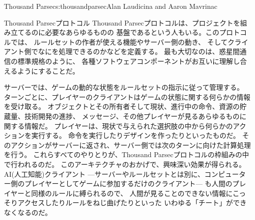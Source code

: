 \begin{aosachapter}{Thousand Parsec}{s:thousandparsec}{Alan Laudicina and Aaron Mavrinac}
\begin{aosasect1}{Thousand Parsecプロトコル}
Thousand Parsecプロトコルは、プロジェクトを組み立てるのに必要なあらゆるものの
基盤であるという人もいる。このプロトコルでは、
ルールセットの作者が使える機能やサーバー側の動き、
そしてクライアント側でなにを処理できるのかなどを定義する。
最も大切なのは、惑星間通信の標準規格のように、
各種ソフトウェアコンポーネントがお互いに理解し合えるようにすることだ。

サーバーでは、ゲームの動的な状態をルールセットの指示に従って管理する。
ターンごとに、プレイヤーのクライアントはゲームの状態に関する何らかの情報を受け取る。
オブジェクトとその所有者そして現状、進行中の命令、資源の貯蔵量、技術開発の進捗、
メッセージ、その他プレイヤーが見るあらゆるものに関する情報だ。
プレイヤーは、現状で与えられた選択肢の中から何らかのアクションを実行する。
命令を実行したりデザインを作ったりといったものだ。
そのアクションがサーバーに返され、サーバー側では次のターンに向けた計算処理を行う。
これらすべてのやりとりが、Thousand Parsecプロトコルの枠組みの中で行われるのだ。
このアーキテクチャのおかげで、興味深い効果が得られる。AI(人工知能)クライアント
---サーバーやルールセットとは別に、コンピューター側のプレイヤーとしてゲームに参加するだけのクライアント---
も人間のプレイヤーと同様のルールに縛られるので、
人間が見ることのできない情報にこっそりアクセスしたりルールをねじ曲げたりといった
いわゆる「チート」ができなくなるのだ。


\end{aosasect1}
\end{aosachapter}
